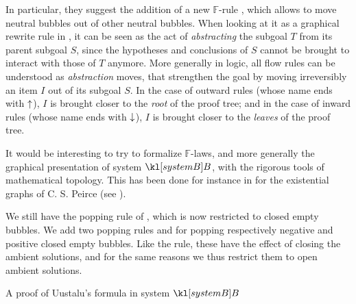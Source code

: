 \begin{description}
  In particular, they suggest the addition of a new $\mathbb{F}$-rule
  , which allows to move neutral bubbles out of other neutral
  bubbles. When looking at it as a graphical rewrite rule in
  , it can be seen as the act of \emph{abstracting} the
  subgoal $T$ from its parent subgoal $S$, since the hypotheses and conclusions
  of $S$ cannot be brought to interact with those of $T$ anymore. More generally
  in  logic, all flow rules can be understood as
  \emph{abstraction} moves, that strengthen the goal by moving irreversibly an
  item $I$ out of its subgoal $S$. In the case of outward rules (whose name ends
  with $\uparrow$), $I$ is brought closer to the \emph{root} of the proof tree;
  and in the case of inward rules (whose name ends with $\downarrow$), $I$ is
  brought closer to the \emph{leaves} of the proof tree.
  
  It would be interesting to try to formalize $\mathbb{F}$-laws, and more
  generally the graphical presentation of system $\sysB$, with the rigorous
  tools of mathematical topology. This has been done for instance in
   for the existential graphs of C. S.
  Peirce (see ).

  \item[\textbf{\membrane}] 
  We still have the popping rule  of , which is now restricted to
  closed empty bubbles. We add two popping rules  and  for
  popping respectively negative and positive closed empty bubbles. Like the
   rule, these have the effect of closing the ambient
  solutions, and for the same reasons we thus restrict them to open ambient
  solutions.

  \begin{marginfigure}
    
    \caption{A proof of Uustalu's formula in system $\sysB$}
  \end{marginfigure}


\end{description}

